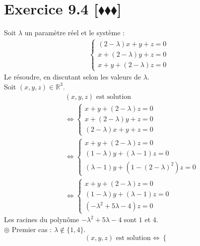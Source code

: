 \documentclass[10pt]{article}
\begin{document}
\section*{Exercice 9.4 [$\blacklozenge\blacklozenge\blacklozenge$]}
\begin{tcolorbox}[enhanced, width=7in, center, size=fbox, fontupper=\large, drop shadow southwest]
    Soit $\lambda$ un paramètre réel et le système :
    \begin{align*}
        \begin{cases}
            (2-\lambda)x + y + z = 0\\
            x + (2-\lambda)y + z = 0\\
            x + y + (2-\lambda)z = 0
        \end{cases}
    \end{align*}
    Le résoudre, en discutant selon les valeurs de $\lambda$.\\
    Soit $(x,y,z)\in\mathbb{R}^3$.
    \begin{align*}
        &(x,y,z) \text{ est solution}\\
        &\iff \begin{cases}
            x + y + (2-\lambda)z = 0\\
            x + (2-\lambda)y + z = 0\\
            (2 - \lambda)x + y + z = 0
        \end{cases}\\
        &\iff \begin{cases}
            x+y+(2-\lambda)z =0\\
            (1-\lambda)y + (\lambda-1)z=0\\
            (\lambda-1)y + (1-(2-\lambda)^2)z=0
        \end{cases}\\
        &\iff \begin{cases}
            x + y + (2-\lambda)z = 0\\
            (1-\lambda)y + (\lambda-1)z = 0\\
            (-\lambda^2 + 5\lambda - 4)z = 0
        \end{cases}
    \end{align*}
    Les racines du polynôme $-\lambda^2+5\lambda-4$ sont $1$ et $4$.\\
    $\circledcirc$ Premier cas : $\lambda\notin\{1,4\}$.
    \begin{equation*}
        (x,y,z) \text{ est solution}
        \iff\begin{cases}

\end{cases}
\end{equation*}
\end{tcolorbox}
\end{document}
